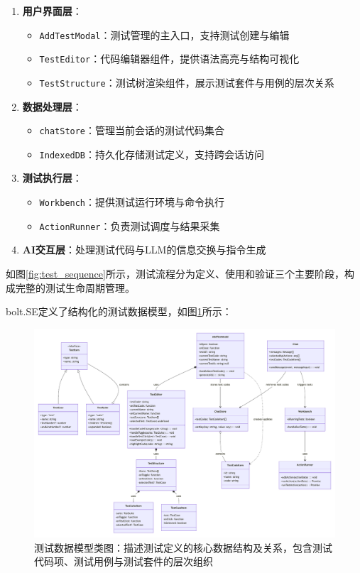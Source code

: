 \begin{enumerate}
  \item \textbf{用户界面层}：
    \begin{itemize}
      \item \texttt{AddTestModal}：测试管理的主入口，支持测试创建与编辑
      \item \texttt{TestEditor}：代码编辑器组件，提供语法高亮与结构可视化
      \item \texttt{TestStructure}：测试树渲染组件，展示测试套件与用例的层次关系
    \end{itemize}
  
  \item \textbf{数据处理层}：
    \begin{itemize}
      \item \texttt{chatStore}：管理当前会话的测试代码集合
      \item \texttt{IndexedDB}：持久化存储测试定义，支持跨会话访问
    \end{itemize}
  
  \item \textbf{测试执行层}：
    \begin{itemize}
      \item \texttt{Workbench}：提供测试运行环境与命令执行
      \item \texttt{ActionRunner}：负责测试调度与结果采集
    \end{itemize}
  
  \item \textbf{AI交互层}：处理测试代码与LLM的信息交换与指令生成
\end{enumerate}

如图\ref{fig:test_sequence}所示，测试流程分为定义、使用和验证三个主要阶段，构成完整的测试生命周期管理。

bolt.SE定义了结构化的测试数据模型，如图\ref{fig:test_class}所示：

\begin{figure}[htbp]
  \centering
  \includegraphics[width=\textwidth]{figures/bolt_test_class.pdf}
  \caption{测试数据模型类图：描述测试定义的核心数据结构及关系，包含测试代码项、测试用例与测试套件的层次组织}
  \label{fig:test_class}
\end{figure}


